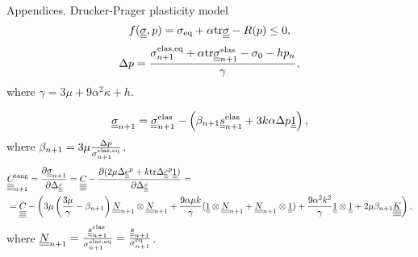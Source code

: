\documentclass[9pt]{beamer}
\begin{document}
\begin{frame}{Appendices. Drucker-Prager plasticity model}
  \begin{equation}
    f(\uusigma, p) = \sigma_{\text{eq}} + \alpha \mtr \uusigma - R(p) \leq 0,
  \end{equation}
  \begin{equation}
    \Delta p = \frac{ \sigmaeqnelas + \alpha \mtr \uusigmanelas - \sigma_0 - h p_n}{ \gamma },
  \end{equation}
  where $\gamma = 3\mu + 9\alpha^2\kappa + h$.

  \begin{equation}
    \uusigma_{n+1} = \uusigma_{n+1}^\text{elas} - \left( \beta_{n+1} \uusnelas + 3k\alpha \Delta p \uuUnit \right),
  \end{equation}
  where $\beta_{n+1} = 3\mu\frac{\Delta p}{\sigmaeqnelas}$.
  \begin{align*}
    & \uuuuC{}^\text{tang}_{n+1} = \frac{\partial\uusigman}{\partial \Delta\uueps} = \uuuuC{} - \frac{\partial (2\mu\Delta\uue^p + k\mtr\Delta\uueps^p\uuUnit)}{\partial\Delta\uueps} = \\
    & = \uuuuC{} - \left( 3\mu\left(\frac{3\mu}{\gamma} - \beta_{n+1}\right)\uuN_{n+1} \otimes \uuN_{n+1} + \frac{9\alpha\mu k}{\gamma} (\uuUnit \otimes \uuN_{n+1} + \uuN_{n+1} \otimes \uuUnit) + \frac{9\alpha^2k^2}{\gamma} \uuUnit \otimes \uuUnit + 2\mu\beta_{n+1} \uuuuK \right),
\end{align*}
where $\uuN_{n+1} = \frac{\uus^\text{elas}_{n+1}}{\sigmaeqnelas} = \frac{\uus_{n+1}}{\sigmaeqn}$.
\end{frame}



\end{document}
